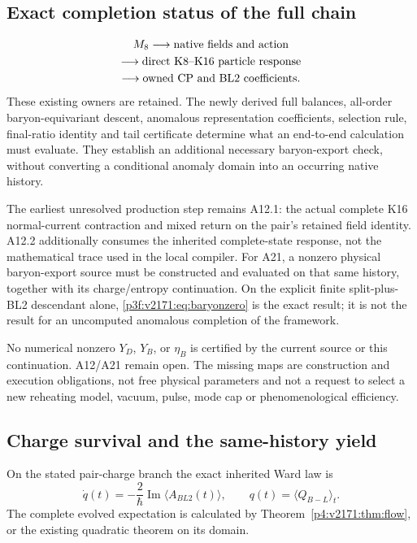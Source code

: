 \documentclass[12pt,a4paper]{article}
\begin{document}
\subsection{Exact completion status of the full chain}
\label{p9:v2171:sec:fullstatus}
\[
 \begin{gathered}
 M_8\longrightarrow\hbox{native fields and action}\\
 \longrightarrow\hbox{direct K8--K16 particle response}\\
 \longrightarrow\hbox{owned CP and BL2 coefficients}.
 \end{gathered}
\]
These existing owners are retained. The newly derived full balances,
all-order baryon-equivariant descent, anomalous representation coefficients,
selection rule, final-ratio identity and tail certificate determine what an
end-to-end calculation must evaluate. They establish an additional
necessary baryon-export check, without converting a conditional anomaly
domain into an occurring native history.

The earliest unresolved production step remains A12.1: the actual complete
K16 normal-current contraction and mixed return on the pair's retained field
identity. A12.2 additionally consumes the inherited complete-state response,
not the mathematical trace used in the local compiler. For A21, a nonzero
physical baryon-export source must be constructed and evaluated on that
same history, together with its charge/entropy continuation. On the
explicit finite split-plus-BL2 descendant alone,
\eqref{p3f:v2171:eq:baryonzero} is the exact result; it is not the result for an
uncomputed anomalous completion of the framework.

No numerical nonzero $Y_D$, $Y_B$, or $\eta_B$ is certified by the current
source or this continuation. A12/A21 remain open. The missing maps are
construction and execution obligations, not free physical parameters and
not a request to select a new reheating model, vacuum, pulse, mode cap or
phenomenological efficiency.
\subsection{Charge survival and the same-history yield}
On the stated pair-charge branch the exact inherited Ward law is
\[
 \dot q(t)=-\frac2\hbar\operatorname{Im}\langle A_{BL2}(t)\rangle,
 \qquad q(t)=\langle Q_{B-L}\rangle_t.
\]
The complete evolved expectation is calculated by
Theorem~\ref{p4:v2171:thm:flow}, or the existing quadratic theorem on its domain.
\end{document}
